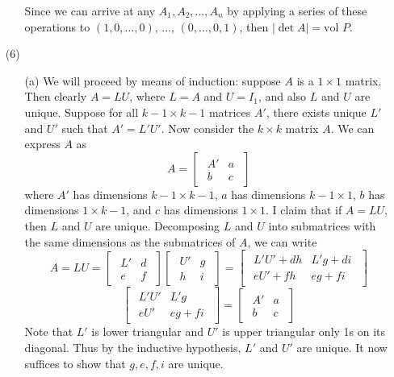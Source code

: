 \begin{itemize}
\begin{itemize}
Since we can arrive at any $A_1, A_2, ..., A_n$ by applying a series of these operations to $(1, 0, ..., 0)$, ..., $(0, ..., 0, 1)$, then $|\det A| = \text{vol }P$.
\end{itemize}
\item[(6)]
\begin{itemize}
\item[(a)]
We will proceed by means of induction: suppose $A$ is a $1 \times 1$ matrix. Then clearly $A = LU$, where $L = A$ and $U = I_1$, and also $L$ and $U$ are unique. Suppose for all $k - 1 \times k - 1$ matrices $A'$, there exists unique $L'$ and $U'$ such that $A' = L'U'$. Now consider the $k \times k$ matrix $A$. We can express $A$ as
$$A = \begin{bmatrix}
\begin{array}{c|c}
A' & a \\
\hline
b & c
\end{array}
\end{bmatrix}$$
where $A'$ has dimensions $k - 1 \times k - 1$, $a$ has dimensions $k - 1 \times 1$, $b$ has dimensions $1 \times k - 1$, and $c$ has dimensions $1 \times 1$. I claim that if $A = LU$, then $L$ and $U$ are unique. Decomposing $L$ and $U$ into submatrices with the same dimensions as the submatrices of $A$, we can write
$$A = LU = \begin{bmatrix}
\begin{array}{c|c}
L' & d \\
\hline
e & f
\end{array}
\end{bmatrix}\begin{bmatrix}
\begin{array}{c|c}
U' & g \\ 
\hline
h & i
\end{array}
\end{bmatrix} = \begin{bmatrix}
\begin{array}{c|c}
L'U' + dh & L'g + di \\
\hline
eU' + fh & eg + fi
\end{array}
\end{bmatrix}$$
$$\begin{bmatrix}
\begin{array}{c|c}
L'U' & L'g \\
\hline
eU' & eg + fi
\end{array}
\end{bmatrix} = \begin{bmatrix}
\begin{array}{c|c}
A' & a \\
\hline
b & c
\end{array}
\end{bmatrix}$$
Note that $L'$ is lower triangular and $U'$ is upper triangular only 1s on its diagonal. Thus by the inductive hypothesis, $L'$ and $U'$ are unique. It now suffices to show that $g, e, f, i$ are unique.


\end{itemize}
\end{itemize}
